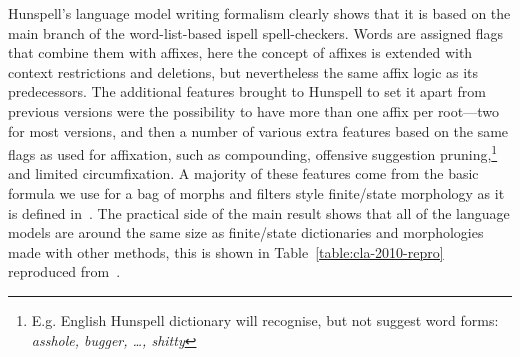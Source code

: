 \documentclass[officiallayout]{unihelcompling}
\begin{document}
Hunspell's language model writing formalism clearly shows that it is based on
the main branch of the word-list-based ispell spell-checkers. Words are
assigned flags that combine them with affixes, here the concept of affixes is
extended with context restrictions and deletions, but nevertheless the same
affix logic as its predecessors. The additional features brought to Hunspell to
set it apart from previous versions were the possibility to have more than one
affix per root---two for most versions, and then a number of various extra
features based on the same flags as used for affixation, such as compounding,
offensive suggestion pruning,\footnote{E.g. English Hunspell dictionary will
    recognise, but not suggest word forms: \emph{asshole, bugger, \ldots,
shitty}} and limited circumfixation.  A majority of these features come from
the basic formula we use for a bag of morphs and filters style finite\-/state
morphology as it is defined in~\citet{linden2009hfst}. The practical side of
the main result shows that all of the language models are around the same size
as finite\-/state dictionaries and morphologies made with other methods, this
is shown in Table~\ref{table:cla-2010-repro} reproduced
from~.
\end{document}
